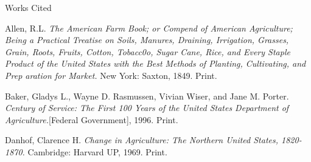 \documentclass[12pt]{article}
\newcommand{\bibent}{\noindent \hangindent 40pt}
\newenvironment{workscited}{\newpage \begin{center} Works Cited \end{center}}{\newpage }
\begin{document}
\begin{flushleft}
\begin{workscited}

\bibent
Allen, R.L. \textit{The American Farm Book; or Compend of American Agriculture; Being a Practical Treatise on Soils, Manures, Draining, Irrigation, Grasses, Grain, Roots, Fruits, Cotton, Tobacc0o, Sugar Cane, Rice, and Every Staple Product of the United States with the Best Methods of Planting, Cultivating, and Prep aration for Market.} New York: Saxton, 1849. Print.

\bibent
Baker, Gladys L., Wayne D. Rasmussen, Vivian Wiser, and Jane M. Porter. \textit{Century of Service: The First 100 Years of the United States Department of Agriculture.}[Federal Government], 1996. Print.

\bibent
Danhof, Clarence H. \textit{Change in Agriculture: The Northern United States, 1820-1870.} Cambridge: Harvard UP, 1969. Print.


\end{workscited}

\end{flushleft}
\end{document}
